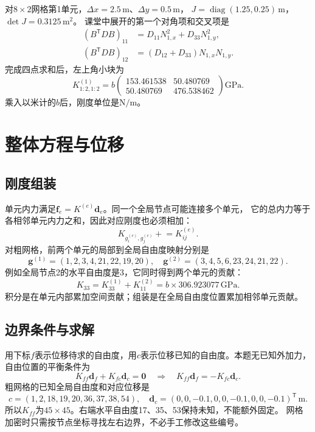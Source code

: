 \documentclass[UTF8,a4paper,fontset=fandol,10pt]{ctexart}
\begin{document}
对$8\times2$网格第1单元，$\Delta x=2.5\,\mathrm m$、$\Delta y=0.5\,\mathrm m$，
$J=\operatorname{diag}(1.25,0.25)\,\mathrm m$，$\det J=0.3125\,\mathrm{m^2}$。
课堂中展开的第一个对角项和交叉项是
\begin{align}
(B^{\mathsf T}DB)_{11}&=D_{11}N_{1,x}^2+D_{33}N_{1,y}^2,\\
(B^{\mathsf T}DB)_{12}&=(D_{12}+D_{33})N_{1,x}N_{1,y}.
\end{align}
完成四点求和后，左上角小块为
\begin{equation}
K^{(1)}_{1:2,1:2}=b
\begin{pmatrix}153.461538&50.480769\\50.480769&476.538462\end{pmatrix}\mathrm{GPa}.
\end{equation}
乘入以米计的$b$后，刚度单位是$\mathrm{N/m}$。

\section{整体方程与位移}
\subsection{刚度组装}
单元内力满足$\mathbf f_e=K^{(e)}\mathbf d_e$。同一个全局节点可能连接多个单元，
它的总内力等于各相邻单元内力之和，因此对应刚度也必须相加：
\begin{equation}
 K_{g_i^{(e)},g_j^{(e)}}\mathrel{+}=K^{(e)}_{ij}.
\end{equation}
对粗网格，前两个单元的局部到全局自由度映射分别是
\[
\mathbf g^{(1)}=(1,2,3,4,21,22,19,20),\quad
\mathbf g^{(2)}=(3,4,5,6,23,24,21,22).
\]
例如全局节点2的水平自由度是3，它同时得到两个单元的贡献：
\[
 K_{33}=K^{(1)}_{33}+K^{(2)}_{11}
       =b\times306.923077\,\mathrm{GPa}.
\]
积分是在单元内部累加空间贡献；组装是在全局自由度位置累加相邻单元贡献。

\subsection{边界条件与求解}
用下标$f$表示位移待求的自由度，用$c$表示位移已知的自由度。本题无已知外加力，
自由位置的平衡条件为
\begin{equation}
 K_{ff}\mathbf d_f+K_{fc}\mathbf d_c=\mathbf0
 \quad\Longrightarrow\quad
 \boxed{K_{ff}\mathbf d_f=-K_{fc}\mathbf d_c.}
\end{equation}
粗网格的已知全局自由度和对应位移是
\[
c=(1,2,18,19,20,36,37,38,54),\quad
\mathbf d_c=(0,0,-0.1,0,0,-0.1,0,0,-0.1)^{\mathsf T}\,\mathrm m.
\]
所以$K_{ff}$为$45\times45$。右端水平自由度17、35、53保持未知，不能额外固定。
网格加密时只需按节点坐标寻找左右边界，不必手工修改这些编号。
\end{document}
